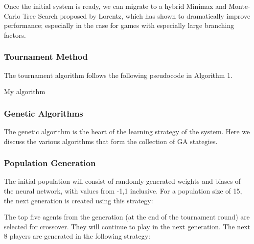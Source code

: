 \documentclass[12pt,a4paper]{article}
\makeatletter
\def\BState{\State\hskip-\ALG@thistlm}
\makeatother
\begin{document}
Once the initial system is ready, we can migrate to a hybrid Minimax and  Monte-Carlo Tree Search proposed by Lorentz, which has shown to dramatically improve performance; especially in the case for games with especially large branching factors.

\subsubsection{Tournament Method}

The tournament algorithm follows the following pseudocode in Algorithm 1.

\begin{algorithm}
    \caption{My algorithm}
\end{algorithm}

\cite{budgen}

\subsubsection{Genetic Algorithms}

The genetic algorithm is the heart of the learning strategy of the system. Here we discuss the various algorithms that form the collection of GA stategies.

\subsubsection{Population Generation}

The initial population will consist of randomly generated weights and biases of the neural network, with values from -1,1 inclusive. For a population size of 15, the next generation is created using this strategy:

The top five agents from the generation (at the end of the tournament round) are selected for crossover. They will continue to play in the next generation.
The next 8 players are generated in the following strategy:
\end{document}
